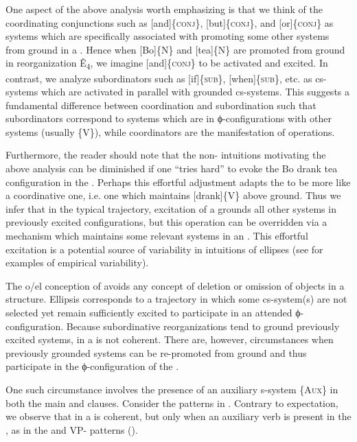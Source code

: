   One aspect of the above analysis worth emphasizing is that we think of the coordinating conjunctions such as [and]\{\textsc{conj}\}, [but]\{\textsc{conj}\}, and [or]\{\textsc{conj}\} as systems which are specifically associated with promoting some other systems from ground in a . Hence when [Bo]\{N\} and [tea]\{N\} are promoted from ground in reorganization Ê\textsubscript{4}, we imagine [and]\{\textsc{conj}\} to be activated and excited. In contrast, we analyze subordinators such as [if]\{\textsc{sub}\}, [when]\{\textsc{sub}\}, etc. as cs-systems which are activated in parallel with grounded cs-systems. This suggests a fundamental difference between coordination and subordination such that subordinators correspond to systems which are in ϕ-con\-fig\-u\-ra\-tions with other systems (usually \{V\}), while coordinators are the manifestation of  operations.

  Furthermore, the reader should note that the non- intuitions motivating the above analysis can be diminished if one “tries hard” to evoke the {\textbar}Bo drank tea{\textbar} configuration in the . Perhaps this effortful adjustment adapts the  to be more like a coordinative one, i.e. one which maintains [drank]\{V\} above ground. Thus we infer that in the typical  trajectory, excitation of a  grounds all other systems in previously excited configurations, but this operation can be overridden via a mechanism which maintains some relevant systems in an . This effortful excitation is a potential source of variability in  intuitions of ellipses (see \citealt{FrazierClifton2005,Phillips2003,PhillipsParker2014} for examples of empirical variability). 

  The o/el conception of  avoids any concept of deletion or omission of objects in a structure. Ellipsis corresponds to a trajectory in which some cs-system(s) are not selected yet remain sufficiently excited to participate in an attended ϕ-con\-fig\-u\-ra\-tion. Because subordinative reorganizations tend to ground previously excited systems,  in a  is not coherent. There are, however, circumstances when previously grounded systems can be re-pro\-moted from ground and thus participate in the ϕ-con\-fig\-u\-ra\-tion of the . 

  One such circumstance involves the presence of an auxiliary s-system \{A\textsc{ux}\} in both the main and  clauses. Consider the patterns in {}. Contrary to expectation, we observe that  in a  is coherent, but only when an auxiliary verb is present in the , as in the  and VP- patterns (\citealt{Johnson2001,Johnson2009,Merchant2001}).

